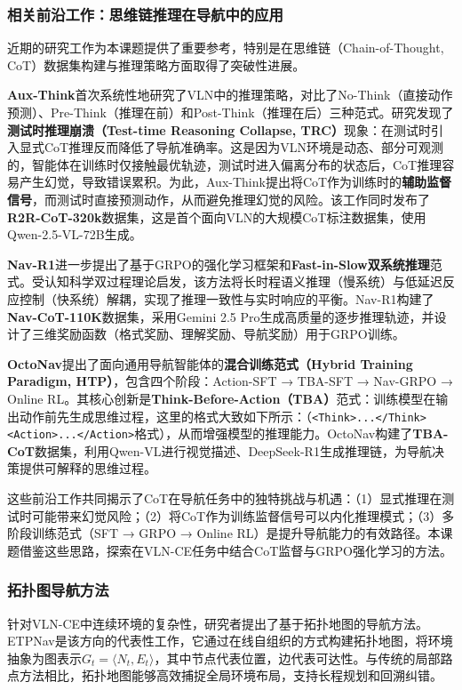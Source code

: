 \subsubsection{相关前沿工作：思维链推理在导航中的应用}
近期的研究工作为本课题提供了重要参考，特别是在思维链（Chain-of-Thought, CoT）数据集构建与推理策略方面取得了突破性进展。

\textbf{Aux-Think}\cite{aux_think}首次系统性地研究了VLN中的推理策略，对比了No-Think（直接动作预测）、Pre-Think（推理在前）和Post-Think（推理在后）三种范式。研究发现了\textbf{测试时推理崩溃（Test-time Reasoning Collapse, TRC）}现象：在测试时引入显式CoT推理反而降低了导航准确率。这是因为VLN环境是动态、部分可观测的，智能体在训练时仅接触最优轨迹，测试时进入偏离分布的状态后，CoT推理容易产生幻觉，导致错误累积。为此，Aux-Think提出将CoT作为训练时的\textbf{辅助监督信号}，而测试时直接预测动作，从而避免推理幻觉的风险。该工作同时发布了\textbf{R2R-CoT-320k}数据集，这是首个面向VLN的大规模CoT标注数据集，使用Qwen-2.5-VL-72B生成。

\textbf{Nav-R1}\cite{nav_r1}进一步提出了基于GRPO的强化学习框架和\textbf{Fast-in-Slow双系统推理}范式。受认知科学双过程理论启发，该方法将长时程语义推理（慢系统）与低延迟反应控制（快系统）解耦，实现了推理一致性与实时响应的平衡。Nav-R1构建了\textbf{Nav-CoT-110K}数据集，采用Gemini 2.5 Pro生成高质量的逐步推理轨迹，并设计了三维奖励函数（格式奖励、理解奖励、导航奖励）用于GRPO训练。

\textbf{OctoNav}\cite{octonav}提出了面向通用导航智能体的\textbf{混合训练范式（Hybrid Training Paradigm, HTP）}，包含四个阶段：Action-SFT → TBA-SFT → Nav-GRPO → Online RL。其核心创新是\textbf{Think-Before-Action（TBA）}范式：训练模型在输出动作前先生成思维过程，这里的格式大致如下所示：（\texttt{<Think>...</Think>}\texttt{<Action>...</Action>}格式），从而增强模型的推理能力。OctoNav构建了\textbf{TBA-CoT}数据集，利用Qwen-VL进行视觉描述、DeepSeek-R1生成推理链，为导航决策提供可解释的思维过程。

这些前沿工作共同揭示了CoT在导航任务中的独特挑战与机遇：（1）显式推理在测试时可能带来幻觉风险；（2）将CoT作为训练监督信号可以内化推理模式；（3）多阶段训练范式（SFT → GRPO → Online RL）是提升导航能力的有效路径。本课题借鉴这些思路，探索在VLN-CE任务中结合CoT监督与GRPO强化学习的方法。

\subsubsection{拓扑图导航方法}
针对VLN-CE中连续环境的复杂性，研究者提出了基于拓扑地图的导航方法。ETPNav\cite{etpnav}是该方向的代表性工作，它通过在线自组织的方式构建拓扑地图，将环境抽象为图表示$G_t = \langle N_t, E_t \rangle$，其中节点代表位置，边代表可达性。与传统的局部路点方法相比，拓扑地图能够高效捕捉全局环境布局，支持长程规划和回溯纠错。

